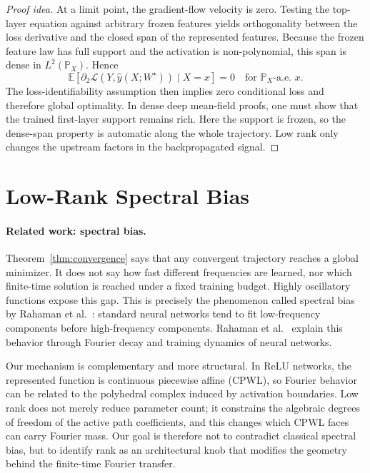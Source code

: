 \documentclass{article}
\newcommand{\E}{\mathbb{E}}
\newcommand{\Pp}{\mathbb{P}}
\newcommand{\calL}{\mathcal{L}}
\begin{document}
\begin{proof}[Proof idea]
At a limit point, the gradient-flow velocity is zero. Testing the top-layer equation against arbitrary frozen features yields orthogonality between the loss derivative and the closed span of the represented features. Because the frozen feature law has full support and the activation is non-polynomial, this span is dense in $L^2(\Pp_X)$. Hence
\begin{equation}
\E\left[\partial_2\calL\left(Y,\hat y(X;W^\star)\right)\mid X=x\right]=0
\quad\text{for }\Pp_X\text{-a.e. }x.
\end{equation}
The loss-identifiability assumption then implies zero conditional loss and therefore global optimality. In dense deep mean-field proofs, one must show that the trained first-layer support remains rich. Here the support is frozen, so the dense-span property is automatic along the whole trajectory. Low rank only changes the upstream factors in the backpropagated signal.
\end{proof}

\section{Low-Rank Spectral Bias}
\label{sec:spectral-transition}

\paragraph{Related work: spectral bias.}
Theorem~\ref{thm:convergence} says that any convergent trajectory reaches a global minimizer. It does not say how fast different frequencies are learned, nor which finite-time solution is reached under a fixed training budget. Highly oscillatory functions expose this gap. This is precisely the phenomenon called spectral bias by Rahaman et al.~\cite{rahaman2019}: standard neural networks tend to fit low-frequency components before high-frequency components. Rahaman et al.~\cite{rahaman2019} explain this behavior through Fourier decay and training dynamics of neural networks.

Our mechanism is complementary and more structural. In ReLU networks, the represented function is continuous piecewise affine (CPWL), so Fourier behavior can be related to the polyhedral complex induced by activation boundaries. Low rank does not merely reduce parameter count; it constrains the algebraic degrees of freedom of the active path coefficients, and this changes which CPWL faces can carry Fourier mass. Our goal is therefore not to contradict classical spectral bias, but to identify rank as an architectural knob that modifies the geometry behind the finite-time Fourier transfer.
\end{document}
